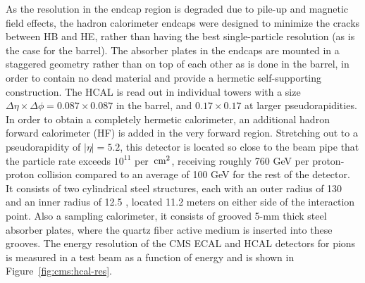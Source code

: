 As the resolution in the endcap region is degraded due to pile-up and magnetic field effects, the hadron calorimeter endcaps were designed to minimize the cracks between HB and HE, rather than having the best single-particle resolution (as is the case for the barrel).
The absorber plates in the endcaps are mounted in a staggered geometry rather than on top of each other as is done in the barrel, in order to contain no dead material and provide a hermetic self-supporting construction.
The HCAL is read out in individual towers with a size $\Delta \eta \times \Delta \phi = 0.087 \times 0.087$ in the barrel, and $0.17 \times 0.17$ at larger pseudorapidities. 
In order to obtain a completely hermetic calorimeter, an additional hadron forward calorimeter (HF) is added in the very forward region.
Stretching out to a pseudorapidity of $|\eta|= 5.2$, this detector is located so close to the beam pipe that the particle rate exceeds $10^{11}$ per $\,\text{cm}^2$, receiving roughly 760 GeV per proton-proton collision compared to an average of 100 GeV for the rest of the detector. It consists of two cylindrical steel structures, each with an outer radius of 130 \cm and an inner radius of 12.5 \cm, located 11.2 meters on either side of the interaction point. Also a sampling calorimeter, it consists of grooved 5-mm thick steel absorber plates, where the quartz fiber active medium is inserted into these grooves.
The energy resolution of the CMS ECAL and HCAL detectors for pions is measured in a test beam as a function of energy and is shown in Figure~\ref{fig:cms:hcal-res}.
